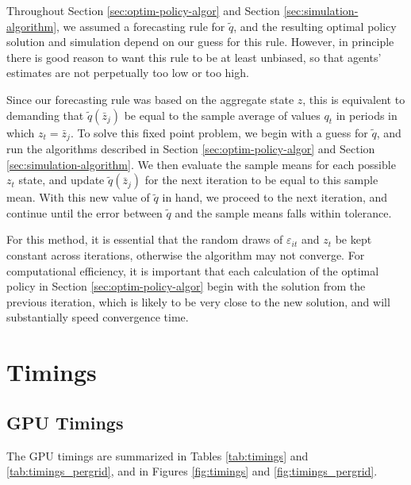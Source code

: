 \documentclass[a4paper,12pt]{article}
\newcommand{\eps}{\varepsilon}
\numberwithin{equation}{section}
\theoremstyle{definition}
\begin{document}
Throughout Section \ref{sec:optim-policy-algor} and Section
\ref{sec:simulation-algorithm}, we assumed a forecasting rule for
$\tilde{q}$, and the resulting optimal policy solution and simulation
depend on our guess for this rule. However, in principle there is good
reason to want this rule to be at least unbiased, so that agents'
estimates are not perpetually too low or too high.

Since our forecasting rule was based on the aggregate state $z$, this
is equivalent to demanding that $\tilde{q}(\bar{z}_j)$ be equal to the
sample average of values $q_t$ in periods in which $z_t =
\bar{z}_j$. To solve this fixed point problem, we begin with a guess
for $\tilde{q}$, and run the algorithms described in Section
\ref{sec:optim-policy-algor} and Section
\ref{sec:simulation-algorithm}. We then evaluate the sample means for
each possible $z_t$ state, and update $\tilde{q}(\bar{z}_j)$ for the
next iteration to be equal to this sample mean. With this new value of
$\tilde{q}$ in hand, we proceed to the next iteration, and continue
until the error between $\tilde{q}$ and the sample means falls within
tolerance.

For this method, it is essential that the random draws of $\eps_{it}$
and $z_t$ be kept constant across iterations, otherwise the algorithm
may not converge. For computational efficiency, it is important that
each calculation of the optimal policy in Section
\ref{sec:optim-policy-algor} begin with the solution from the previous
iteration, which is likely to be very close to the new solution, and
will substantially speed convergence time.

\section{Timings}
\label{sec:timings}

\subsection{GPU Timings}

The GPU timings are summarized in Tables \ref{tab:timings} and
\ref{tab:timings_pergrid}, and in Figures \ref{fig:timings} and
\ref{fig:timings_pergrid}.
\end{document}
